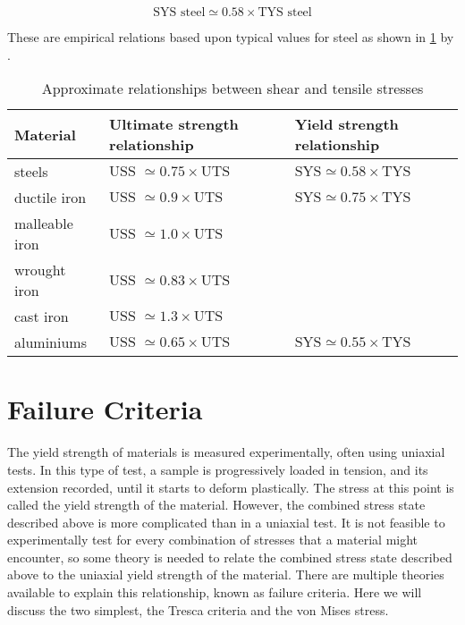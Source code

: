 \begin{equation}
    \text{SYS steel} \simeq 0.58 \times \text{TYS steel}
\end{equation}

These are empirical relations based upon typical values for steel as shown in \cref{tbl-uts-relationships} by .

\begin{table}
  \caption[Approximate relationships between shear and tensile stresses]{Approximate relationships between shear and tensile stresses \cite{deutschman1975}}
  \label{tbl-uts-relationships}
  \center{}
  \small
  \begin{tabular}{p{} p{} p{}}
    \toprule
    Material & Ultimate strength relationship & Yield strength relationship \\
    \midrule
    steels & \(\text{USS } \simeq 0.75 \times \text{UTS}\) & \(\text{SYS} \simeq 0.58 \times \text{TYS}\) \\
    ductile iron & \(\text{USS } \simeq 0.9 \times \text{UTS}\) & \(\text{SYS} \simeq 0.75 \times \text{TYS}\) \\
    malleable iron & \(\text{USS } \simeq 1.0 \times \text{UTS}\) &  \\
    wrought iron & \(\text{USS } \simeq 0.83 \times \text{UTS}\) &  \\
    cast iron & \(\text{USS } \simeq 1.3 \times \text{UTS}\) &  \\
    aluminiums & \(\text{USS } \simeq 0.65 \times \text{UTS}\) & \(\text{SYS} \simeq 0.55 \times \text{TYS}\) \\
    \bottomrule
  \end{tabular}
\end{table}

\section{Failure Criteria}

The yield strength of materials is measured experimentally, often using uniaxial tests. In this type of test, a sample is progressively loaded in tension, and its extension recorded, until it starts to deform plastically. The stress at this point is called the yield strength of the material. However, the combined stress state described above is more complicated than in a uniaxial test. It is not feasible to experimentally test for every combination of stresses that a material might encounter, so some theory is needed to relate the combined stress state described above to the uniaxial yield strength of the material. There are multiple theories available to explain this relationship, known as failure criteria. Here we will discuss the two simplest, the Tresca criteria and the von Mises stress.

